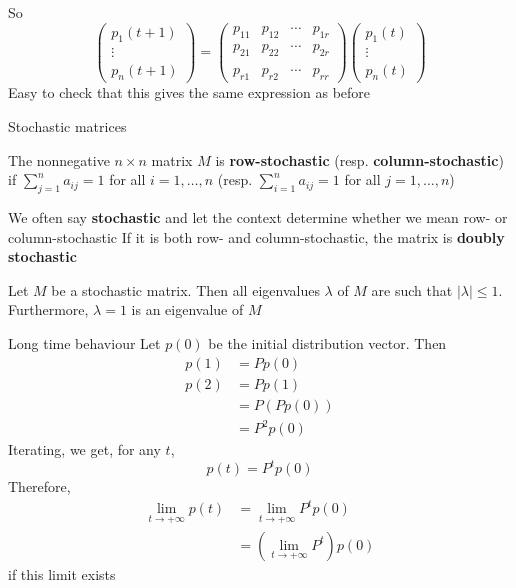\documentclass[aspectratio=169]{beamer}\usepackage[]{graphicx}\usepackage[]{xcolor}
\begin{document}
\begin{frame}
So
\[
\begin{pmatrix}
	p_1(t+1)\\ \vdots\\ p_n(t+1)
\end{pmatrix}
=
\begin{pmatrix}
p_{11} & p_{12} & \cdots & p_{1r} \\
p_{21} & p_{22} & \cdots & p_{2r} \\
&&& \\
p_{r1} & p_{r2} & \cdots & p_{rr}
\end{pmatrix}
\begin{pmatrix}
	p_1(t)\\ \vdots\\ p_n(t)
\end{pmatrix}
\]
\vfill
Easy to check that this gives the same expression as before
\end{frame}



\begin{frame}{Stochastic matrices}
\begin{definition}
The nonnegative $n\times n$ matrix $M$ is \textbf{row-stochastic} (resp. \textbf{column-stochastic}) if $\sum_{j=1}^na_{ij}=1$ for all $i=1,\dots,n$ (resp. $\sum_{i=1}^na_{ij}=1$ for all $j=1,\dots,n$)
\end{definition}
\vfill
We often say \textbf{stochastic} and let the context determine whether we mean row- or column-stochastic
\vfill
If it is both row- and column-stochastic, the matrix is \textbf{doubly stochastic}
\vfill
\begin{theorem}\label{th:spectrum_stochastic_matrix}
Let $M$ be a stochastic matrix. Then all eigenvalues $\lambda$ of $M$ are such that $|\lambda|\leq 1$. 
Furthermore, $\lambda =1$ is an eigenvalue of $M$
\end{theorem}
\end{frame}

\begin{frame}{Long time behaviour}
Let $p(0)$ be the initial distribution vector. Then
\begin{align*}
p(1) &= Pp(0) \\
p(2) &= Pp(1)\\
&= P(Pp(0)) \\
&= P^2p(0)
\end{align*}
\vfill
Iterating, we get, for any $t$,
\[
p(t)=P^tp(0)
\]
\vfill
Therefore, 
\begin{align*}
\lim_{t\rightarrow +\infty}p(t) &=
\lim_{t\rightarrow +\infty}P^tp(0) \\
&=\left(\lim_{t\rightarrow +\infty}P^t\right)p(0)
\end{align*}
if this limit exists
\end{frame}
\end{document}
